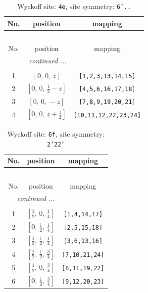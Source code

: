 \documentclass[fleqn,8pt]{jsarticle}
\begin{document}
\renewcommand{\arraystretch}{1.2}
\begin{longtable}{ccc}
\caption{Wyckoff site: {\tt 4e}, site symmetry: {\tt 6'..}}
 \\
 \hline \hline
No. & position & mapping \\ \hline \endfirsthead

\multicolumn{2}{l}{\tablename\ \thetable{}} \\
 \hline \hline
No. & position & mapping \\ \hline \endhead

 \hline \hline
\multicolumn{2}{r}{\footnotesize\it continued ...} \\ \endfoot

 \hline \hline
\multicolumn{2}{r}{} \\ \endlastfoot

1 & $\left[ 0,\, 0,\, z \right]$ & {\tt [1,2,3,13,14,15]} \\ \hline
2 & $\left[ 0,\, 0,\, \frac{1}{2} - z \right]$ & {\tt [4,5,6,16,17,18]} \\ \hline
3 & $\left[ 0,\, 0,\, - z \right]$ & {\tt [7,8,9,19,20,21]} \\ \hline
4 & $\left[ 0,\, 0,\, z + \frac{1}{2} \right]$ & {\tt [10,11,12,22,23,24]} \\
\end{longtable}
\renewcommand{\arraystretch}{1.2}
\begin{longtable}{ccc}
\caption{Wyckoff site: {\tt 6f}, site symmetry: {\tt 2'22'}}
 \\
 \hline \hline
No. & position & mapping \\ \hline \endfirsthead

\multicolumn{2}{l}{\tablename\ \thetable{}} \\
 \hline \hline
No. & position & mapping \\ \hline \endhead

 \hline \hline
\multicolumn{2}{r}{\footnotesize\it continued ...} \\ \endfoot

 \hline \hline
\multicolumn{2}{r}{} \\ \endlastfoot

1 & $\left[ \frac{1}{2},\, 0,\, \frac{1}{4} \right]$ & {\tt [1,4,14,17]} \\ \hline
2 & $\left[ 0,\, \frac{1}{2},\, \frac{1}{4} \right]$ & {\tt [2,5,15,18]} \\ \hline
3 & $\left[ \frac{1}{2},\, \frac{1}{2},\, \frac{1}{4} \right]$ & {\tt [3,6,13,16]} \\ \hline
4 & $\left[ \frac{1}{2},\, \frac{1}{2},\, \frac{3}{4} \right]$ & {\tt [7,10,21,24]} \\ \hline
5 & $\left[ \frac{1}{2},\, 0,\, \frac{3}{4} \right]$ & {\tt [8,11,19,22]} \\ \hline
6 & $\left[ 0,\, \frac{1}{2},\, \frac{3}{4} \right]$ & {\tt [9,12,20,23]} \\
\end{longtable}
\end{document}
